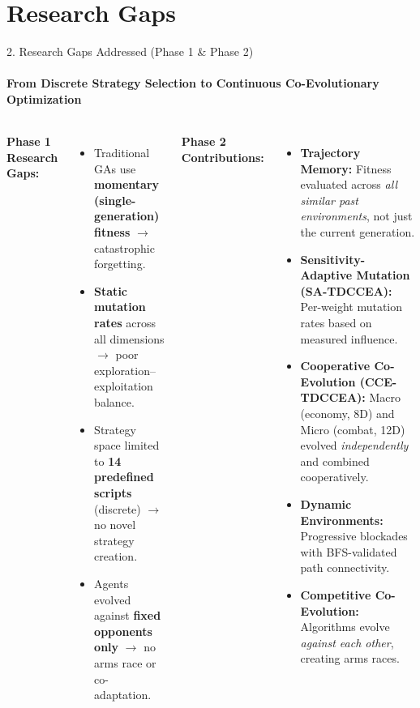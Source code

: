 \documentclass[aspectratio=169, 11pt]{beamer}
\begin{document}
\section{Research Gaps}
\begin{frame}{2. Research Gaps Addressed (Phase 1 \& Phase 2)}
    \framesubtitle{From Discrete Strategy Selection to Continuous Co-Evolutionary Optimization}

    \begin{columns}[T]
        \textbf{\textcolor{amritaMaroon}{Phase 1 Research Gaps:}}
        \begin{itemize}\small
            \item Traditional GAs use \textbf{momentary (single-generation) fitness} $\rightarrow$ catastrophic forgetting.
            \item \textbf{Static mutation rates} across all dimensions $\rightarrow$ poor exploration--exploitation balance.
            \item Strategy space limited to \textbf{14 predefined scripts} (discrete) $\rightarrow$ no novel strategy creation.
            \item Agents evolved against \textbf{fixed opponents only} $\rightarrow$ no arms race or co-adaptation.
        \end{itemize}

        \textbf{\textcolor{amritaMaroon}{Phase 2 Contributions:}}
        \begin{itemize}\small
            \item \textbf{Trajectory Memory:} Fitness evaluated across \textit{all similar past environments}, not just the current generation.
            \item \textbf{Sensitivity-Adaptive Mutation (SA-TDCCEA):} Per-weight mutation rates based on measured influence.
            \item \textbf{Cooperative Co-Evolution (CCE-TDCCEA):} Macro (economy, 8D) and Micro (combat, 12D) evolved \textit{independently} and combined cooperatively.
            \item \textbf{Dynamic Environments:} Progressive blockades with BFS-validated path connectivity.
            \item \textbf{Competitive Co-Evolution:} Algorithms evolve \textit{against each other}, creating arms races.
        \end{itemize}
    \end{columns}
\end{frame}
\end{document}
